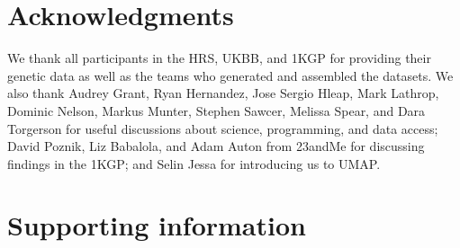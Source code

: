 \section{Acknowledgments}
We thank all participants in the HRS, UKBB, and 1KGP for providing their genetic data as well as the teams who generated and assembled the datasets. We also thank Audrey Grant, Ryan Hernandez, Jose Sergio Hleap, Mark Lathrop, Dominic Nelson, Markus Munter, Stephen Sawcer, Melissa Spear, and Dara Torgerson for useful discussions about science, programming, and data access; David Poznik, Liz Babalola, and Adam Auton from 23andMe for discussing findings in the 1KGP; and Selin Jessa for introducing us to UMAP.


\clearpage

\section{Supporting information}



\clearpage